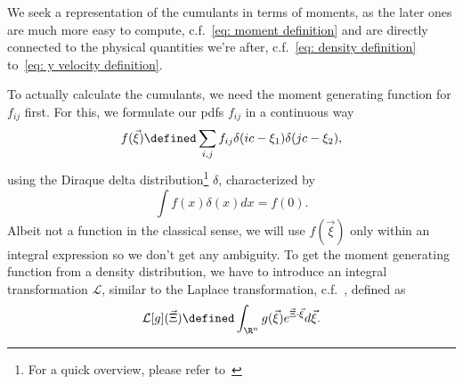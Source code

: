 We seek a representation of the cumulants in terms of moments, as the later ones are much more easy to compute, c.f.~\eqref{eq: moment definition} and are directly connected to the physical quantities we're after, c.f.~\eqref{eq: density definition} to~\eqref{eq: y velocity definition}.

To actually calculate the cumulants, we need the moment generating function for $f_{ij}$ first.
For this, we formulate our \glspl{pdf} $f_{ij}$ in a continuous way
\begin{equation}
  \label{eq:Definition of f xi}
  f(\vec{\xi}) \defined \sum_{i,j} f_{ij}\delta(ic - \xi_1)\delta(jc - \xi_2),
\end{equation}
using the Diraque delta distribution\footnote{For a quick overview, please refer to~\cite{weissteinDelta}} $\delta$, characterized by
\begin{equation}
  \int f(x)\delta(x)dx = f(0).
\end{equation}
Albeit not a function in the classical sense, we will use $f(\vec{\xi})$ only within an integral expression so we don't get any ambiguity.
To get the moment generating function from a density distribution, we have to introduce an integral transformation $\mathcal{L}$, similar to the Laplace transformation, c.f.~\cite{weissteinLaplace}, defined as
\begin{equation}
  \label{eq: Definition of integral transformation}
  \mathcal{L}[g](\vec{\Xi}) \defined \int_{\R^n} g(\vec{\xi}) e^{\vec{\Xi} \cdot \vec{\xi}}d\vec{\xi}.
\end{equation}


